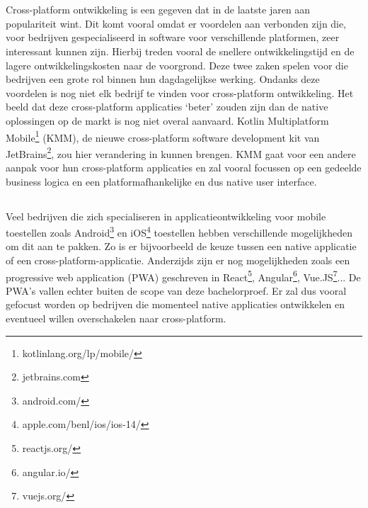 
\chapter{}
\label{ch:inleiding}

Cross-platform ontwikkeling is een gegeven dat in de laatste jaren aan populariteit wint. Dit komt vooral omdat er voordelen aan verbonden zijn die, voor bedrijven gespecialiseerd in software voor verschillende platformen, zeer interessant kunnen zijn. Hierbij treden vooral de snellere ontwikkelingstijd en de lagere ontwikkelingskosten naar de voorgrond. Deze twee zaken spelen voor die bedrijven een grote rol binnen hun dagdagelijkse werking. Ondanks deze voordelen is nog niet elk bedrijf te vinden voor cross-platform ontwikkeling. Het beeld dat deze cross-platform applicaties `beter' zouden zijn dan de native oplossingen op de markt is nog niet overal aanvaard. Kotlin Multiplatform Mobile\footnote{kotlinlang.org/lp/mobile/} (KMM), de nieuwe cross-platform software development kit van JetBrains\footnote{jetbrains.com}, zou hier verandering in kunnen brengen. KMM gaat voor een andere aanpak voor hun cross-platform applicaties en zal vooral focussen op een gedeelde business logica en een platformafhankelijke en dus native user interface. 


\section{}
\label{sec:probleemstelling}

Veel bedrijven die zich specialiseren in applicatieontwikkeling voor mobile toestellen zoals Android\footnote{android.com/} en iOS\footnote{apple.com/benl/ios/ios-14/} toestellen hebben verschillende mogelijkheden om dit aan te pakken. Zo is er bijvoorbeeld de keuze tussen een native applicatie of een cross-platform-applicatie. Anderzijds zijn er nog mogelijkheden zoals een progressive web application (PWA) geschreven in React\footnote{reactjs.org/}, Angular\footnote{angular.io/}, Vue.JS\footnote{vuejs.org/}... De PWA's vallen echter buiten de scope van deze bachelorproef. Er zal dus vooral gefocust worden op bedrijven die momenteel native applicaties ontwikkelen en eventueel willen overschakelen naar cross-platform.


